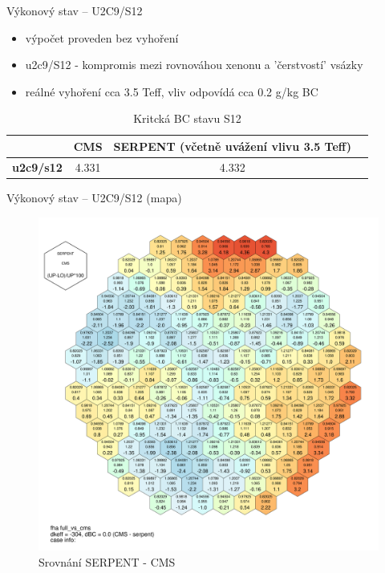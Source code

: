 \documentclass{beamer}
\begin{document}
\begin{frame}{Výkonový stav -- U2C9/S12}

\begin{itemize}\footnotesize
	\item výpočet proveden bez vyhoření 
	\item u2c9/S12 - kompromis mezi rovnováhou xenonu a 'čerstvostí' vsázky
	\item reálné vyhoření cca 3.5 Teff, vliv odpovídá cca 0.2 g/kg BC
\end{itemize}
	
\begin{table}[h]\scriptsize
	\begin{center}
		\begin{tabular}{cccc}
			\toprule
			& CMS     & SERPENT (\tiny včetně uvážení vlivu 3.5 Teff) \\
			\midrule
			\textbf{u2c9/s12  } & 4.331    & 4.332    \\
			\bottomrule
		\end{tabular}
		\caption{\footnotesize Kritcká BC stavu S12}
	\end{center}
\end{table}
\end{frame}






\begin{frame}{Výkonový stav -- U2C9/S12 (mapa)}
\begin{figure}[!h]
	\centering
	\includegraphics[scale=0.08]{img/fha_full_vs_cms.pdf}
	\caption{Srovnání SERPENT - CMS}
\end{figure}
\end{frame}
\end{document}
